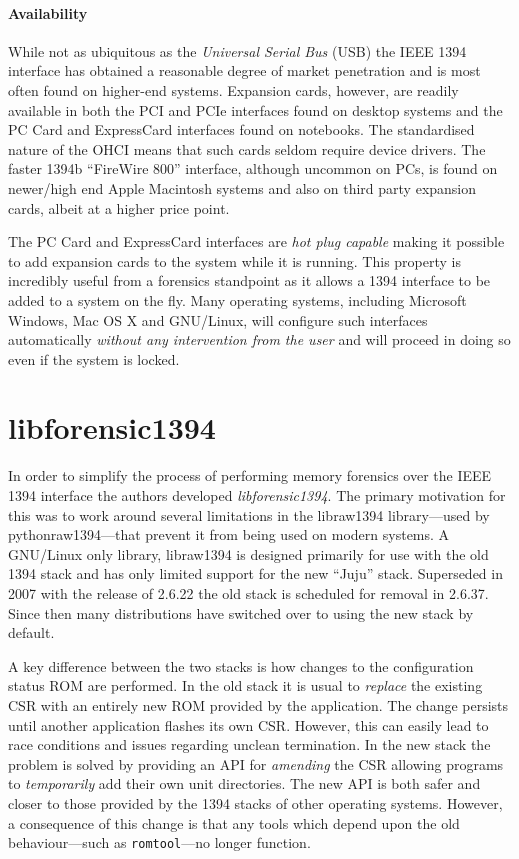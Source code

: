 \documentclass[numbers=noenddot,      %
               abstract,              %
               captions=tableheading, %
               DIV=8]                 %
              {scrartcl}
\begin{document}
\paragraph{Availability}
While not as ubiquitous as the \emph{Universal Serial Bus} (USB) the
IEEE 1394 interface has obtained a reasonable degree of market
penetration and is most often found on higher-end systems. Expansion
cards, however, are readily available in both the PCI and PCIe
interfaces found on desktop systems and the PC Card and ExpressCard
interfaces found on notebooks. The standardised nature of the OHCI means
that such cards seldom require device drivers. The faster 1394b
``FireWire 800'' interface, although uncommon on PCs, is found on
newer/high end Apple Macintosh systems and also on third party expansion
cards, albeit at a higher price point.

The PC Card and ExpressCard interfaces are \emph{hot plug capable}
making it possible to add expansion cards to the system while it is
running. This property is incredibly useful from a forensics standpoint
as it allows a 1394 interface to be added to a system on the fly. Many
operating systems, including Microsoft Windows, Mac OS X and GNU/Linux,
will configure such interfaces automatically \emph{without any
  intervention from the user} and will proceed in doing so even if the
system is locked.

\section{libforensic1394}
\label{sec:libforensic1394}

In order to simplify the process of performing memory forensics over the
IEEE 1394 interface the authors developed \emph{libforensic1394}. The
primary motivation for this was to work around several limitations in
the libraw1394 library---used by pythonraw1394---that prevent it from
being used on modern systems. A GNU/Linux only library, libraw1394 is
designed primarily for use with the old 1394 stack and has only limited
support for the new ``Juju'' stack. Superseded in 2007 with the release
of 2.6.22 the old stack is scheduled for removal in 2.6.37. Since then
many distributions have switched over to using the new stack by default.

A key difference between the two stacks is how changes to the
configuration status ROM are performed. In the old stack it is usual to
\emph{replace} the existing CSR with an entirely new ROM provided by the
application. The change persists until another application flashes its
own CSR. However, this can easily lead to race conditions and issues
regarding unclean termination. In the new stack the problem is solved by
providing an API for \emph{amending} the CSR allowing programs to
\emph{temporarily} add their own unit directories. The new API is both
safer and closer to those provided by the 1394 stacks of other operating
systems. However, a consequence of this change is that any tools which
depend upon the old behaviour---such as \verb:romtool:---no longer
function.
\end{document}
